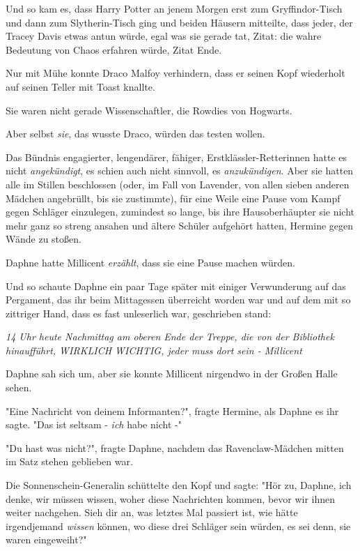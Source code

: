 {Und so kam es, dass Harry Potter an jenem Morgen erst zum Gryffindor-Tisch und dann zum Slytherin-Tisch ging und beiden Häusern mitteilte, dass jeder, der Tracey Davis etwas antun würde, egal was sie gerade tat, Zitat: die wahre Bedeutung von Chaos erfahren würde, Zitat Ende.

Nur mit Mühe konnte Draco Malfoy verhindern, dass er seinen Kopf wiederholt auf seinen Teller mit Toast knallte.

Sie waren nicht gerade Wissenschaftler, die Rowdies von Hogwarts.

Aber selbst \emph{sie}, das wusste Draco, würden das testen wollen.

Das Bündnis engagierter, lengendärer, fähiger, Erstklässler-Retterinnen hatte es nicht \emph{angekündigt}, es schien auch nicht sinnvoll, es \emph{anzukündigen}. Aber sie hatten alle im Stillen beschlossen (oder, im Fall von Lavender, von allen sieben anderen Mädchen angebrüllt, bis sie zustimmte), für eine Weile eine Pause vom Kampf gegen Schläger einzulegen, zumindest so lange, bis ihre Hausoberhäupter sie nicht mehr ganz so streng ansahen und ältere Schüler aufgehört hatten, Hermine gegen Wände zu stoßen.

Daphne hatte Millicent \emph{erzählt}, dass sie eine Pause machen würden.

Und so schaute Daphne ein paar Tage später mit einiger Verwunderung auf das Pergament, das ihr beim Mittagessen überreicht worden war und auf dem mit so zittriger Hand, dass es fast unleserlich war, geschrieben stand:

\emph{\emph{14 Uhr heute Nachmittag am oberen Ende der Treppe, die von der Bibliothek hinaufführt, WIRKLICH WICHTIG, jeder muss dort sein - Millicent}}

Daphne sah sich um, aber sie konnte Millicent nirgendwo in der Großen Halle sehen.

"Eine Nachricht von deinem Informanten?", fragte Hermine, als Daphne es ihr sagte. "Das ist seltsam - \emph{ich} habe nicht -"

"Du hast was nicht?", fragte Daphne, nachdem das Ravenclaw-Mädchen mitten im Satz stehen geblieben war.

Die Sonnenschein-Generalin schüttelte den Kopf und sagte: "Hör zu, Daphne, ich denke, wir müssen wissen, woher diese Nachrichten kommen, bevor wir ihnen weiter nachgehen. Sieh dir an, was letztes Mal passiert ist, wie hätte irgendjemand \emph{wissen} können, wo diese drei Schläger sein würden, es sei denn, sie waren eingeweiht?"

}

